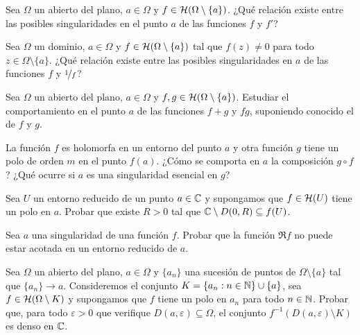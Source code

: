 \begin{ejercicio}
    Sea $\Omega$ un abierto del plano, $a \in \Omega$ y $f \in \mathcal{H}(\Omega \setminus \{a\})$. ¿Qué relación existe entre las posibles singularidades en el punto $a$ de las funciones $f$ y $f'$?
\end{ejercicio}

\begin{ejercicio}
    Sea $\Omega$ un dominio, $a \in \Omega$ y $f \in \mathcal{H}(\Omega \setminus \{a\})$ tal que $f(z) \neq 0$ para todo $z \in \Omega \setminus \{a\}$. ¿Qué relación existe entre las posibles singularidades en $a$ de las funciones $f$ y $\nicefrac{1}{f}$?
\end{ejercicio}

\begin{ejercicio}
    Sea $\Omega$ un abierto del plano, $a \in \Omega$ y $f, g \in \mathcal{H}(\Omega \setminus \{a\})$. Estudiar el comportamiento en el punto $a$ de las funciones $f + g$ y $f g$, suponiendo conocido el de $f$ y $g$.
\end{ejercicio}

\begin{ejercicio}
    La función $f$ es holomorfa en un entorno del punto $a$ y otra función $g$ tiene un polo de orden $m$ en el punto $f(a)$. ¿Cómo se comporta en $a$ la composición $g \circ f$? ¿Qué ocurre si $a$ es una singularidad esencial en $g$?
\end{ejercicio}

\begin{ejercicio}
    Sea $U$ un entorno reducido de un punto $a \in \mathbb{C}$ y supongamos que $f \in \mathcal{H}(U)$ tiene un polo en $a$. Probar que existe $R > 0$ tal que $\mathbb{C} \setminus D(0,R) \subseteq f(U)$.
\end{ejercicio}

\begin{ejercicio}
    Sea $a$ una singularidad de una función $f$. Probar que la función $\Re f$ no puede estar acotada en un entorno reducido de $a$.
\end{ejercicio}

\begin{ejercicio}
    Sea $\Omega$ un abierto del plano, $a \in \Omega$ y $\{a_n\}$ una sucesión de puntos de $\Omega \setminus \{a\}$ tal que $\{a_n\} \to a$. Consideremos el conjunto $K = \{a_n : n \in \mathbb{N}\} \cup \{a\}$, sea $f \in \mathcal{H}(\Omega \setminus K)$ y supongamos que $f$ tiene un polo en $a_n$ para todo $n \in \mathbb{N}$. Probar que, para todo $\varepsilon > 0$ que verifique $D(a, \varepsilon) \subseteq \Omega$, el conjunto $f^{-1}(D(a, \varepsilon) \setminus K)$ es denso en $\mathbb{C}$.
\end{ejercicio}